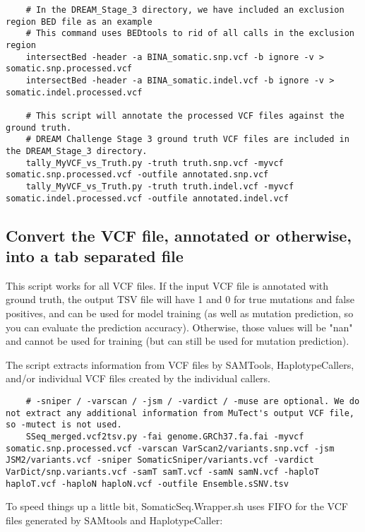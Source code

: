 \documentclass[10pt,letterpaper]{article}
\begin{document}
	\begin{lstlisting}
	# In the DREAM_Stage_3 directory, we have included an exclusion region BED file as an example
	# This command uses BEDtools to rid of all calls in the exclusion region
	intersectBed -header -a BINA_somatic.snp.vcf -b ignore -v > somatic.snp.processed.vcf
	intersectBed -header -a BINA_somatic.indel.vcf -b ignore -v > somatic.indel.processed.vcf
	
	# This script will annotate the processed VCF files against the ground truth.
	# DREAM Challenge Stage 3 ground truth VCF files are included in the DREAM_Stage_3 directory.
	tally_MyVCF_vs_Truth.py -truth truth.snp.vcf -myvcf somatic.snp.processed.vcf -outfile annotated.snp.vcf
	tally_MyVCF_vs_Truth.py -truth truth.indel.vcf -myvcf somatic.indel.processed.vcf -outfile annotated.indel.vcf
	\end{lstlisting}



	\subsection{Convert the VCF file, annotated or otherwise, into a tab separated file}
	This script works for all VCF files. If the input VCF file is annotated with ground truth, the output TSV file will have 1 and 0 for true mutations and false positives, and can be used for model training (as well as mutation prediction, so you can evaluate the prediction accuracy). Otherwise, those values will be "nan" and cannot be used for training (but can still be used for mutation prediction). 
	
	The script extracts information from VCF files by SAMTools, HaplotypeCallers, and/or individual VCF files created by the individual callers. 
	
	
	\begin{lstlisting}
	# -sniper / -varscan / -jsm / -vardict / -muse are optional. We do not extract any additional information from MuTect's output VCF file, so -mutect is not used. 
	SSeq_merged.vcf2tsv.py -fai genome.GRCh37.fa.fai -myvcf somatic.snp.processed.vcf -varscan VarScan2/variants.snp.vcf -jsm JSM2/variants.vcf -sniper SomaticSniper/variants.vcf -vardict VarDict/snp.variants.vcf -samT samT.vcf -samN samN.vcf -haploT haploT.vcf -haploN haploN.vcf -outfile Ensemble.sSNV.tsv
	\end{lstlisting}
	
	To speed things up a little bit, SomaticSeq.Wrapper.sh uses FIFO for the VCF files generated by SAMtools and HaplotypeCaller:
	
\end{document}
